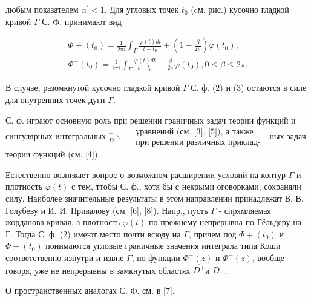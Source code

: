 \documentclass[10pt]{article}
\begin{document}
любым показателем $\alpha^{\prime}<1$. Для угловых точек $t_{0}$ (cм. рис.) кусочно гладкой кривой $\Gamma$ С. Ф. принимают вид



\[

\begin{gathered}

\Phi+\left(t_{0}\right)=\frac{1}{2 \pi i} \int_{\Gamma} \frac{\varphi(t) d t}{t-t_{0}}+\left(1-\frac{\beta}{2 \pi}\right) \varphi\left(t_{0}\right), \\

\Phi^{-}\left(t_{0}\right)=\frac{1}{2 \pi i} \int_{\Gamma} \frac{\varphi(t) d t}{t-t_{0}}-\frac{\beta}{2 \pi} \varphi\left(t_{0}\right), 0 \leqslant \beta \leqslant 2 \pi .

\end{gathered}

\]



В случае, разомкнутой кусочно гладкой кривой $\Gamma$ С. ф. (2) и (3) остаются в силе для внутренних точек дуги $\Gamma$.



С. ф. играют основную роль при решении граничных задач теории функций и сингулярных интегральных ${ }_{D}^{+} \backslash \begin{aligned} & \text { уравнений (см. [3], [5]), а также } \\ & \text { при решении различных приклад- }\end{aligned}$ ных задач теории функций (см. [4]).



Естественно возникает вопрос о возможном расширении условий на контур $\Gamma$ и плотность $\varphi(t)$ с тем, ттобы С. ф., хотя бы с некрыми оговорками, сохраняли силу. Наиболее значительные результаты в этом направлении принадлежат В. В. Голубеву и И. И. Привалову (см. [6], [8]). Напр., пусть $\Gamma$ - спрямляемая жорданова кривая, а плотность $\varphi(t)$ по-прежнему непрерывна по Гёльдеру на Г. Тогда С. ф. (2) имеют место почти всюду на $\Gamma$, причем под $\Phi+\left(t_{0}\right)$ и $\Phi-\left(t_{0}\right)$ понимаются угловые граничные значения интеграла типа Коши соответственно изнутри и извне $\Gamma$, но функции $\Phi^{+}(z)$ и $\Phi^{-}(z)$, вообще говоря, уже не непрерывны в замкнутых областях $\overline{D^{+}}$и $\overline{D^{-}}$.



О пространственных аналогах С. Ф. см. в [7].
\end{document}
